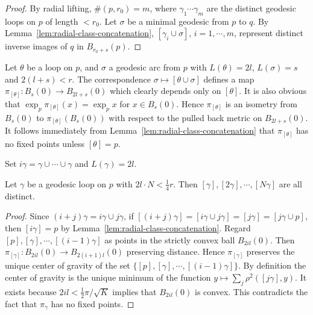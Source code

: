 \begin{proof}
\sketch
By radial lifting, $\#(p,r_0)=m$, where $\gamma_1 \cdots \gamma_m$ are the distinct
geodesic loops on $p$ of length $< r_0$. Let $\sigma$ be a minimal geodesic from
$p$ to $q$. By Lemma~\ref{lem:radial-class-concatenation}, $[\gamma_i \cup \sigma]$, $i=1,\cdots,m$, represent
distinct inverse images of $q$ in $B_{r_0+s}(p)$.
\end{proof}

Let $\theta$ be a loop on $p$, and $\sigma$ a geodesic arc from $p$ with
$L(\theta)=2l$, $L(\sigma)=s$ and $2(l+s)<r$. The correspondence
$\sigma \mapsto [\theta \cup \sigma]$ defines a map $\pi_{[\theta]}: B_s(0) \to
B_{2l+s}(0)$ which clearly depends only on $[\theta]$. It is also obvious that
$\exp_p \pi_{[\theta]}(x)=\exp_p x$ for $x \in B_s(0)$. Hence $\pi_{[\theta]}$ is
an isometry from $B_s(0)$ to $\pi_{[\theta]}(B_s(0))$ with respect to the pulled
back metric on $B_{2l+s}(0)$. It follows immediately from Lemma~\ref{lem:radial-class-concatenation} that
$\pi_{[\theta]}$ has no fixed points unless $[\theta]=p$.

Set $i\gamma=\gamma\cup \cdots \cup \gamma$ and $L(\gamma)=2l$.

\begin{lemma}
\label{lem:iterated-geodesic-loops}

Let $\gamma$ be a geodesic loop on $p$ with $2l \cdot N < \frac14 r$. Then
$[\gamma], [2\gamma], \cdots, [N\gamma]$ are all distinct.
\end{lemma}

\begin{proof}
\sketch
Since $(i+j)\gamma=i\gamma \cup j\gamma$, if
$[(i+j)\gamma]=[i\gamma \cup j\gamma]=[j\gamma]=[j\gamma \cup p]$, then
$[i\gamma]=p$ by Lemma~\ref{lem:radial-class-concatenation}. Regard $[p],[\gamma],\cdots,[(i-1)\gamma]$ as points
in the strictly convex ball $B_{2il}(0)$. Then $\pi_{[\gamma]}: B_{2il}(0) \to
B_{2(i+1)l}(0)$ preserving distance. Hence $\pi_{[\gamma]}$ preserves the unique
center of gravity of the set $\{[p],[\gamma],\cdots,[(i-1)\gamma]\}$. By
definition the center of gravity is the unique minimum of the function
$y \mapsto \sum_j \rho^2([j\gamma],y)$. It exists because $2il < \frac12
\pi/\sqrt{K}$ implies that $B_{2il}(0)$ is convex. This contradicts the fact that
$\pi_\gamma$ has no fixed points.
\end{proof}

